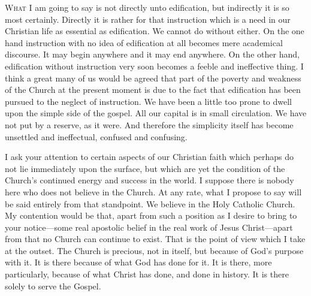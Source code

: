 \documentclass[draft]{ptfdoc}
\begin{document}
\textsc{What} I am going to say is not directly unto 
edification, but indirectly it is so most 
certainly. Directly it is rather for that instruction 
which is a need in our Christian life as 
essential as edification. We cannot do without 
either. On the one hand instruction with no idea 
of edification at all becomes mere academical 
discourse. It may begin anywhere and it may 
end anywhere. On the other hand, edification 
without instruction very soon becomes a feeble 
and ineffective thing. I think a great many of 
us would be agreed that part of the poverty 
and weakness of the Church at the present 
moment is due to the fact that edification has 
been pursued to the neglect of instruction. We 
have been a little too prone to dwell upon the 
simple side of the gospel. All our capital is in
small circulation. We have not put by a reserve, 
as it were. And therefore the simplicity 
itself has become unsettled and ineffectual, confused 
and confusing. 

I ask your attention to certain aspects of 
our Christian faith which perhaps do not lie 
immediately upon the surface, but which are 
yet the condition of the Church's continued 
energy and success in the world. I suppose there 
is nobody here who does not believe in the 
Church. At any rate, what I propose to say 
will be said entirely from that standpoint. We 
believe in the Holy Catholic Church. My contention 
would be that, apart from such a position 
as I desire to bring to your notice---some 
real apostolic belief in the real work of Jesus 
Christ---apart from that no Church can continue 
to exist. That is the point of view which I take 
at the outset. The Church is precious, not in 
itself, but because of God's purpose with it. It 
is there because of what God has done for it. 
It is there, more particularly, because of what 
Christ has done, and done in history. It is 
there solely to serve the Gospel. 
\end{document}
